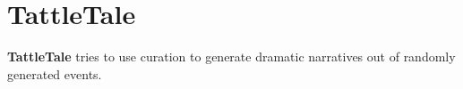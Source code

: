 \chapter{Tattle\+Tale}
\hypertarget{index}{}\label{index}
\label{index_md_extradocs_2mainpage}%
%
 {\bfseries{Tattle\+Tale}} tries to use curation to generate dramatic narratives out of randomly generated events. 